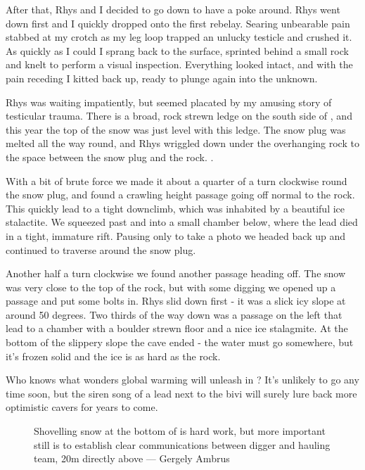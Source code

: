 After that, Rhys and I decided to go down to have a poke around. Rhys went down first and I quickly dropped onto the first rebelay. Searing unbearable pain stabbed at my crotch as my leg loop trapped an unlucky testicle and crushed it. As quickly as I could I sprang back to the surface, sprinted behind a small rock and knelt to perform a visual inspection. Everything looked intact, and with the pain receding I kitted back up, ready to plunge again into the unknown.


Rhys was waiting impatiently, but seemed placated by my amusing story of testicular trauma. There is a broad, rock strewn ledge on the south side of , and this year the top of the snow was just level with this ledge. The snow plug was melted all the way round, and Rhys wriggled down under the overhanging rock to the space between the snow plug and the rock. .

With a bit of brute force we made it about a quarter of a turn clockwise round the snow plug, and found a crawling height passage going off normal to the rock. This quickly lead to a tight downclimb, which was inhabited by a beautiful ice stalactite. We squeezed past and into a small chamber below, where the lead died in a tight, immature rift. Pausing only to take a photo we headed back up and continued to traverse around the snow plug.



Another half a turn clockwise we found another passage heading off. The snow was very close to the top of the rock, but with some digging we opened up a passage and put some bolts in. Rhys slid down first - it was a slick icy slope at around 50 degrees. Two thirds of the way down was a passage on the left that lead to a chamber with a boulder strewn floor and a nice ice stalagmite. At the bottom of the slippery slope the cave ended - the water must go somewhere, but it’s frozen solid and the ice is as hard as the rock.



Who knows what wonders global warming will unleash in ? It’s unlikely to go any time soon, but the siren song of a lead next to the bivi will surely lure back more optimistic cavers for years to come.

\begin{figure}[b!]
\checkoddpage \ifoddpage \forcerectofloat \else \forceversofloat \fi
\centering
{}
\caption{Shovelling snow at the bottom of \protect{} is hard work, but more important still is to establish clear communications between digger and hauling team, 20m directly above --- Gergely Ambrus}
\label{bottom of M10}
\end{figure}

